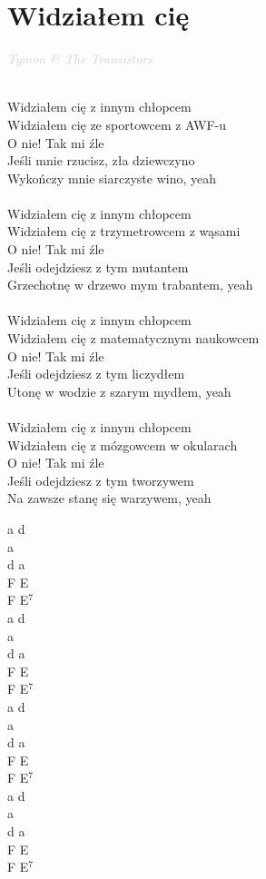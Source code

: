 \documentclass[a5paper, 10pt]{book}
\begin{document}
\section{Widziałem cię}\textcolor{lightgray}{\textit{Tymon & The Transistors
}}\\~\\
\begin{minipage}[t]{0.8\textwidth}
Widziałem cię z innym chłopcem\\
Widziałem cię ze sportowcem z AWF-u\\
O nie! Tak mi źle\\
Jeśli mnie rzucisz, zła dziewczyno\\
Wykończy mnie siarczyste wino, yeah\\
\\
Widziałem cię z innym chłopcem\\
Widziałem cię z trzymetrowcem z wąsami\\
O nie! Tak mi źle\\
Jeśli odejdziesz z tym mutantem\\
Grzechotnę w drzewo mym trabantem, yeah\\
\\
Widziałem cię z innym chłopcem\\
Widziałem cię z matematycznym naukowcem\\
O nie! Tak mi źle\\
Jeśli odejdziesz z tym liczydłem\\
Utonę w wodzie z szarym mydłem, yeah\\
\\
Widziałem cię z innym chłopcem\\
Widziałem cię z mózgowcem w okularach\\
O nie! Tak mi źle\\
Jeśli odejdziesz z tym tworzywem\\
Na zawsze stanę się warzywem, yeah\\
\end{minipage}
\begin{minipage}[t]{0.2\textwidth}
a d\\
a\\
d a\\
F E\\
F E$^7$\\

a d\\
a\\
d a\\
F E\\
F E$^7$\\

a d\\
a\\
d a\\
F E\\
F E$^7$\\

a d\\
a\\
d a\\
F E\\
F E$^7$\\
\end{minipage}
\end{document}
